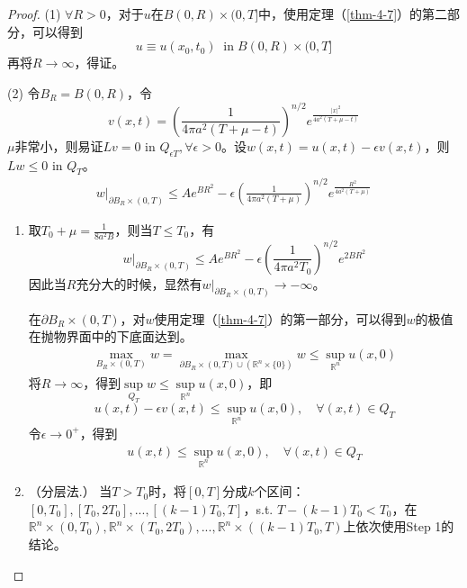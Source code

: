 \documentclass[11pt, a4paper]{article}
\theoremstyle{theorem}
\begin{document}
\begin{proof}
(1) $\forall R > 0$，对于$u$在$B(0,R) \times (0,T]$中，使用定理（\ref{thm-4-7}）的第二部分，可以得到
$$
u \equiv u(x_0,t_0) \; \; \text{in} \; B(0,R) \times (0,T]
$$
再将$R \rightarrow \infty$，得证。

(2) 令$B_R = B(0,R)$，令
$$
v(x,t) = \left(\frac{1}{4\pi a^2(T + \mu -t)}\right)^{n/2} e^{\frac{|x|^2}{4a^2(T + \mu -t)}}
$$
$\mu$非常小，则易证$L v = 0$ in $Q_{\epsilon T}, \forall \epsilon > 0$。设$w(x,t) = u(x,t) - \epsilon v(x,t)$，则$L w \leq 0$ in $Q_T$。
\begin{align}
    w\bigg|_{\partial B_R \times (0,T)} \leq A e^{BR^2} - \epsilon \left(\frac{1}{4\pi a^2 (T + \mu)}\right)^{n/2} e^{\frac{R^2}{4a^2 (T + \mu)}}
\end{align}
\begin{enumerate}[Step 1.]
  \item 取$T_0 + \mu = \frac{1}{8a^2B}$，则当$T \leq T_0$，有
  $$
  w\bigg|_{\partial B_R \times (0,T)} \leq A e^{BR^2} - \epsilon \left(\frac{1}{4\pi a^2 T_0}\right)^{n/2} e^{2BR^2}
  $$
  因此当$R$充分大的时候，显然有$w\bigg|_{\partial B_R \times (0,T)} \to - \infty$。

  在$\partial B_R \times (0,T)$，对$w$使用定理（\ref{thm-4-7}）的第一部分，可以得到$w$的极值在抛物界面中的下底面达到。
  \begin{align}
      \max\limits_{B_R \times (0,T)} w = \max\limits_{\partial B_R \times (0,T) \cup (\mathbb{R}^n \times \{0\})} w \leq \sup\limits_{\mathbb{R}^n} u(x,0)
  \end{align}
  将$R \rightarrow \infty$，得到$\sup\limits_{Q_T} w \leq \sup\limits_{\mathbb{R}^n} u(x,0)$，即
  $$
  u(x,t) - \epsilon v(x,t) \leq \sup\limits_{\mathbb{R}^n} u(x,0), \quad \forall (x,t) \in Q_T
  $$
  令$\epsilon \rightarrow 0^+$，得到
  \begin{align}
      u(x,t) \leq \sup\limits_{\mathbb{R}^n} u(x,0), \quad \forall (x,t) \in Q_T
  \end{align}
  \item （分层法.） 当$T > T_0$时，将$[0,T]$分成$k$个区间：$[0,T_0], [T_0,2T_0], ..., [(k-1)T_0,T]$，s.t. $T - (k-1)T_0 < T_0$，在$\mathbb{R}^n \times (0,T_0), \mathbb{R}^n \times (T_0,2T_0), ..., \mathbb{R}^n \times ((k-1)T_0,T)$上依次使用Step 1的结论。
\end{enumerate}
\end{proof}
\end{document}

